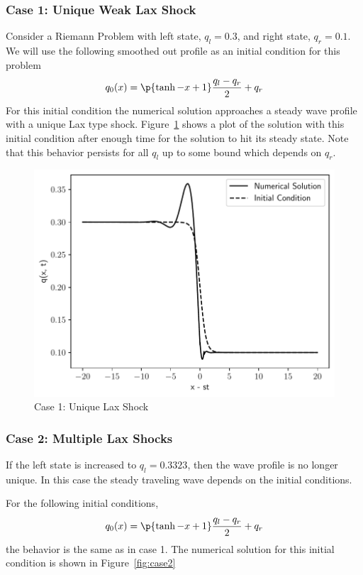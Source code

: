\subsubsection{Case 1: Unique Weak Lax Shock}\label{sssec:case1}
Consider a Riemann Problem with left state, \(q_l = 0.3\), and right state,
\(q_r = 0.1\).
We will use the following smoothed out profile as an initial condition for this
problem
\begin{equation}
  q_0(x) = \p{\tanh{-x} + 1} \frac{q_l - q_r}{2} + q_r
\end{equation}
For this initial condition the numerical solution approaches a steady wave profile
with a unique Lax type shock.
Figure~\ref{fig:case1} shows a plot of the solution with this initial condition after
enough time for the solution to hit its steady state.
Note that this behavior persists for all \(q_l\) up to some bound which depends on
\(q_r\).
\begin{figure}
  \centering
  \includegraphics[scale=0.5]{figures/case_1_1.pdf}
  \caption{Case 1: Unique Lax Shock}\label{fig:case1}
\end{figure}

\subsubsection{Case 2: Multiple Lax Shocks}\label{sssec:case2}
If the left state is increased to \(q_l = 0.3323\), then the wave profile is no
longer unique.
In this case the steady traveling wave depends on the initial conditions.

For the following initial conditions,
\begin{equation}
  q_0(x) = \p{\tanh{-x} + 1} \frac{q_l - q_r}{2} + q_r\label{eq:case2_1}
\end{equation}
the behavior is the same as in case 1.
The numerical solution for this initial condition is shown in Figure~\ref{fig:case2}

